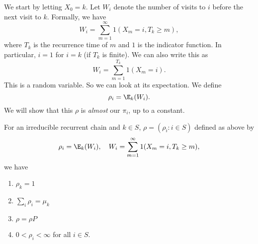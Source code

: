 \documentclass[a4paper]{article}
\begin{document}
We start by letting $X_0 = k$. Let $W_i$ denote the number of visits to $i$ before the next visit to $k$. Formally, we have
\[
  W_i = \sum_{m = 1}^\infty 1(X_m = i, T_k \geq m),
\]
where $T_k$ is the recurrence time of $m$ and $1$ is the indicator function. In particular, $i = 1$ for $i = k$ (if $T_k$ is finite). We can also write this as
\[
  W_i = \sum_{m = 1}^{T_k} 1(X_m = i).
\]
This is a random variable. So we can look at its expectation. We define
\[
  \rho_i = \E_k(W_i).
\]
We will show that this $\rho$ is \emph{almost} our $\pi_i$, up to a constant.
\begin{prop}
  For an irreducible recurrent chain and $k \in S$, $\rho = (\rho_i: i \in S)$ defined as above by
  \[
    \rho_i = \E_k(W_i),\quad W_i = \sum_{m = 1}^\infty 1(X_m = i, T_k \geq m),
  \]
  we have
  \begin{enumerate}
    \item $\rho_k = 1$
    \item $\sum_i \rho_i = \mu_k$
    \item $\rho = \rho P$
    \item $0 < \rho_i < \infty$ for all $i \in S$.
  \end{enumerate}
\end{prop}
\end{document}
